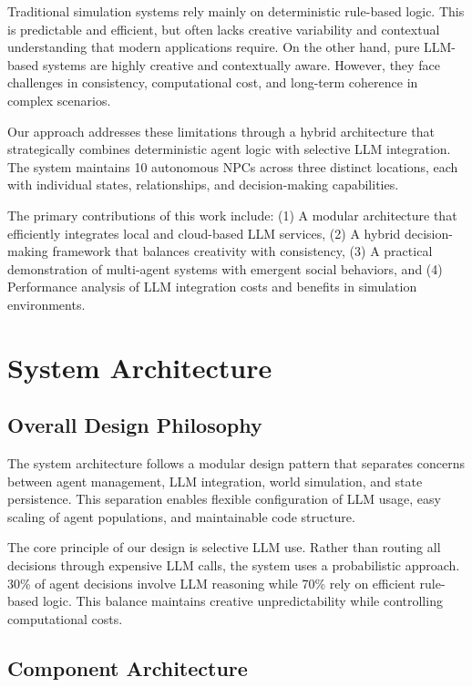 \documentclass[conference]{IEEEtran}
\begin{document}
Traditional simulation systems rely mainly on deterministic rule-based logic. This is predictable and efficient, but often lacks creative variability and contextual understanding that modern applications require. On the other hand, pure LLM-based systems are highly creative and contextually aware. However, they face challenges in consistency, computational cost, and long-term coherence in complex scenarios.

Our approach addresses these limitations through a hybrid architecture that strategically combines deterministic agent logic with selective LLM integration. The system maintains 10 autonomous NPCs across three distinct locations, each with individual states, relationships, and decision-making capabilities.

The primary contributions of this work include: (1) A modular architecture that efficiently integrates local and cloud-based LLM services, (2) A hybrid decision-making framework that balances creativity with consistency, (3) A practical demonstration of multi-agent systems with emergent social behaviors, and (4) Performance analysis of LLM integration costs and benefits in simulation environments.

\section{System Architecture}

\subsection{Overall Design Philosophy}

The system architecture follows a modular design pattern that separates concerns between agent management, LLM integration, world simulation, and state persistence. This separation enables flexible configuration of LLM usage, easy scaling of agent populations, and maintainable code structure.

The core principle of our design is selective LLM use. Rather than routing all decisions through expensive LLM calls, the system uses a probabilistic approach. 30\% of agent decisions involve LLM reasoning while 70\% rely on efficient rule-based logic. This balance maintains creative unpredictability while controlling computational costs.

\subsection{Component Architecture}
\end{document}
